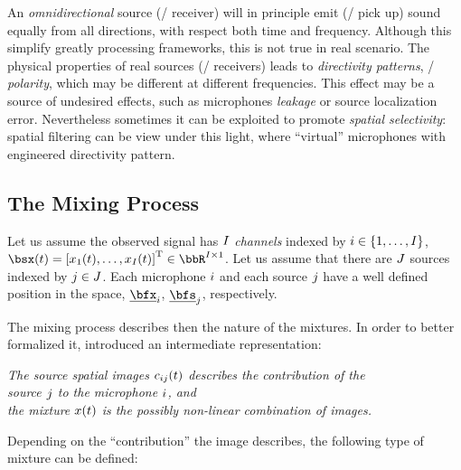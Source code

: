 An \textit{omnidirectional} source (\resp/ receiver) will in principle emit (\resp/ pick up) sound equally from all directions,
with respect both time and frequency.
Although this simplify greatly processing frameworks, this is not true in real scenario.
The physical properties of real sources (\resp/ receivers) leads to \textit{directivity patterns}, \aka/ \textit{polarity}, which may
be different at different frequencies.
This effect may be a source of undesired effects, such as microphones \textit{leakage} or source localization error.
Nevertheless sometimes it can be exploited to promote \textit{spatial selectivity}:
spatial filtering can be view under this light, where ``virtual'' microphones with engineered directivity pattern.

\subsection{The Mixing Process}
Let us assume the observed signal has $I$ \textit{channels} indexed by $\idxMic \in \kbrace{1,\dots,\numMics}$,
$\mics(t) = \ktranspose{\klist{\mic_1(t), \dots, \mic_{\numMics}(t)}} \in \R^{\numMics \times 1}$.
Let us assume that there are $J$ sources indexed by $j \in J$.
Each microphone $i$ and each source $j$ have a well defined position in the space, $\positionMicrophone_\idxMic$, $\positionSource_\idxSrc$, respectively.

The mixing process describes then the nature of the mixtures.
In order to better formalized it, \citeauthor{sturmel2012linear} introduced an intermediate representation:
\begin{center}
    \textit{The \emph{source spatial images} $c_{ij}(t)$ describes the contribution of the
    \\source $j$ to the microphone $i$, and
    \\the \emph{mixture} $x(t)$ is the possibly non-linear combination of images.}
\end{center}
Depending on the ``contribution'' the image describes, the following type of mixture can be defined:

